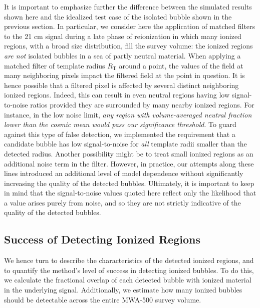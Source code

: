 It is important to emphasize further the difference between the
simulated results shown here and the idealized test case of the
isolated bubble shown in the previous section. In particular, we
consider here the application of matched filters to the 21 cm signal
during a late phase of reionization  in which many ionized regions,
with a broad size distribution, fill the survey volume: the ionized
regions {\em are not} isolated bubbles in a sea of partly neutral
material. When applying a matched filter of template radius
$R_{\text{T}}$ around a point, the values of the field at many
neighboring pixels impact the filtered field at the point in
question. It is hence possible that a filtered pixel is affected by
several distinct neighboring ionized regions. Indeed, this can result
in even neutral regions having low signal-to-noise ratios provided
they are surrounded by many nearby ionized regions. For instance, in
the low noise limit, {\em any region with volume-averaged neutral
  fraction lower than the cosmic mean would pass our significance
  threshold}.  To guard against this type of false detection, we
implemented the requirement that a candidate bubble has low signal-to-noise 
for {\em all} template radii smaller than the detected
radius. Another possibility might be to treat small ionized regions as
an additional noise term in the filter. However, in practice, our attempts along
these lines introduced an additional level of model dependence without
significantly increasing the quality of the
detected bubbles. Ultimately, it is important to keep
in mind that the signal-to-noise values quoted here reflect only the
likelihood that a value arises purely from noise, and so they
are not strictly indicative of the quality of the
detected bubbles. 


\subsection{Success of Detecting Ionized Regions} \label{sec:success}

We hence turn to describe the characteristics of the detected ionized regions,
and to quantify the method's level of success in detecting ionized bubbles. To do this, we
calculate the fractional overlap of each detected bubble with
ionized material in the underlying signal. Additionally, we estimate how
many ionized bubbles should be detectable across the entire MWA-500
survey volume.

